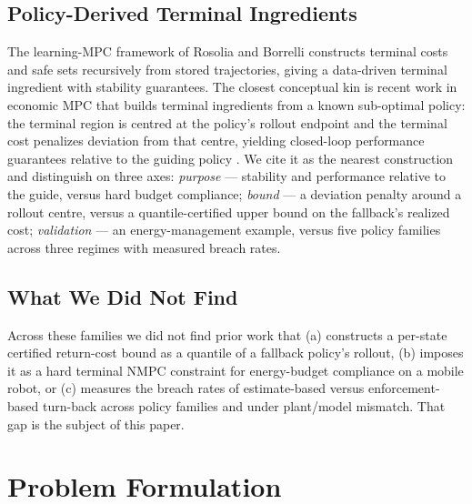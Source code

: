 \documentclass[preprint,12pt]{elsarticle}
\begin{document}
\subsection{Policy-Derived Terminal Ingredients}
The learning-MPC framework of Rosolia and Borrelli
\cite{rosolia2018learning} constructs terminal costs and safe
sets recursively from stored trajectories, giving a data-driven
terminal ingredient with stability guarantees. The closest
conceptual kin is recent work in economic MPC
\cite{ellis2014tutorial} that builds terminal
ingredients from a known sub-optimal policy: the terminal region is
centred at the policy's rollout endpoint and the terminal cost
penalizes deviation from that centre, yielding closed-loop performance
guarantees relative to the guiding policy \cite{msaad2026policy}. We
cite it as the nearest construction and distinguish on three axes:
\emph{purpose} --- stability and performance relative to the guide,
versus hard budget compliance; \emph{bound} --- a deviation penalty
around a rollout centre, versus a quantile-certified upper bound on
the fallback's realized cost; \emph{validation} --- an
energy-management example, versus five policy families across three
regimes with measured breach rates.

\subsection{What We Did Not Find}
Across these families we did not find prior work that (a) constructs a
per-state certified return-cost bound as a quantile of a fallback
policy's rollout, (b) imposes it as a hard terminal NMPC constraint
for energy-budget compliance on a mobile robot, or (c) measures the
breach rates of estimate-based versus enforcement-based turn-back
across policy families and under plant/model mismatch. That gap is the
subject of this paper.

\section{Problem Formulation}
\label{sec:formulation}
\end{document}
